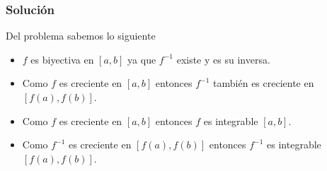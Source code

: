 \documentclass[a4paper]{article}
\begin{document}
\subsubsection*{Solución}
\noindent
Del problema sabemos lo siguiente 
\begin{itemize}
    \item \(f\) es biyectiva en \([a, b]\) ya que \(f^{-1}\) existe y es su inversa.
    \item Como \(f\) es creciente en \([a, b]\) entonces \(f^{-1}\) también es 
    creciente en \([f\left(a\right), f\left(b\right)]\).
    \item Como \(f\) es creciente en \([a, b]\) entonces \(f\) es integrable \([a, b]\).
    \item Como \(f^{-1}\) es creciente en \([f(a), f(b)]\) entonces \(f^{-1}\) es integrable \([f(a), f(b)]\).
\end{itemize}
\end{document}
